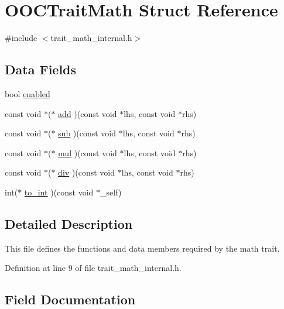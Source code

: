 \hypertarget{structOOCTraitMath}{}\section{O\+O\+C\+Trait\+Math Struct Reference}
\label{structOOCTraitMath}


{\ttfamily \#include $<$trait\+\_\+math\+\_\+internal.\+h$>$}

\subsection*{Data Fields}
\begin{DoxyCompactItemize}
\item 
bool \mbox{\hyperlink{structOOCTraitMath_aa41fea83145bd51c3104475b895126bd}{enabled}}
\item 
const void $\ast$($\ast$ \mbox{\hyperlink{structOOCTraitMath_ab5bd3c26fffceb4281e8a7a6c670bd28}{add}} )(const void $\ast$lhs, const void $\ast$rhs)
\item 
const void $\ast$($\ast$ \mbox{\hyperlink{structOOCTraitMath_af9091282b3de5e335a75e51e54240ec5}{sub}} )(const void $\ast$lhs, const void $\ast$rhs)
\item 
const void $\ast$($\ast$ \mbox{\hyperlink{structOOCTraitMath_a17d60591640141c98fdba744a034a766}{mul}} )(const void $\ast$lhs, const void $\ast$rhs)
\item 
const void $\ast$($\ast$ \mbox{\hyperlink{structOOCTraitMath_af0d15ca84de8dcdf95ab3a57f567d3c5}{div}} )(const void $\ast$lhs, const void $\ast$rhs)
\item 
int($\ast$ \mbox{\hyperlink{structOOCTraitMath_adb6702c7794b114f252fba89f58342cc}{to\+\_\+int}} )(const void $\ast$\+\_\+self)
\end{DoxyCompactItemize}


\subsection{Detailed Description}
This file defines the functions and data members required by the math trait. 

Definition at line 9 of file trait\+\_\+math\+\_\+internal.\+h.



\subsection{Field Documentation}
\mbox{\label{structOOCTraitMath_ab5bd3c26fffceb4281e8a7a6c670bd28}} 
